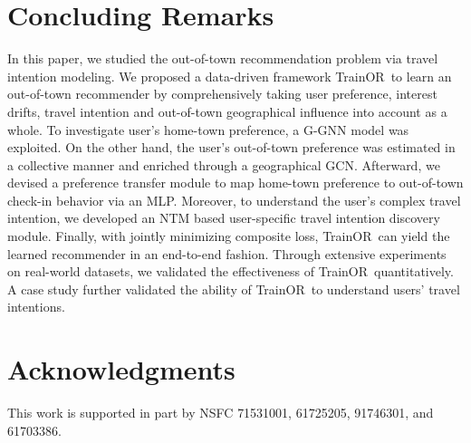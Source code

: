 \documentclass[letterpaper]{article} %
\newcommand{\ourmodel}{{\sc TrainOR}}
\begin{document}
\section{Concluding Remarks}

In this paper, we studied the out-of-town recommendation problem via travel intention modeling. 
We proposed a data-driven framework \ourmodel~to learn an out-of-town recommender by comprehensively taking user preference, interest drifts, travel intention and out-of-town geographical influence into account as a whole. 
To investigate user's home-town preference, a G-GNN model was exploited.
On the other hand, the user's out-of-town preference was estimated in a collective manner and enriched through a geographical GCN. 
Afterward, we devised a preference transfer module to map home-town preference to out-of-town check-in behavior via an MLP. 
Moreover, to understand the user's complex travel intention, we developed an NTM based user-specific travel intention discovery module. 
Finally, with jointly minimizing composite loss, \ourmodel~can yield the learned recommender in an end-to-end fashion.
Through extensive experiments on real-world datasets, we validated the effectiveness of \ourmodel~quantitatively. 
A case study further validated the ability of \ourmodel~to understand users' travel intentions.


\section*{Acknowledgments}

This work is supported in part by NSFC {71531001, 61725205, 91746301, and 61703386}.


%

\end{document}
